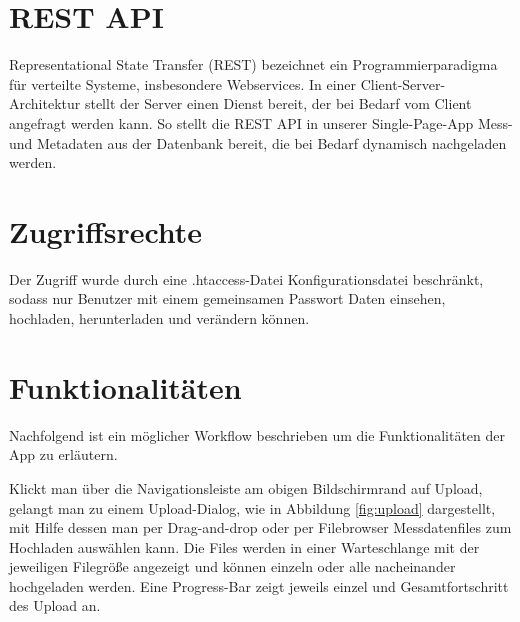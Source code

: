 





\section{REST API}

Representational State Transfer (REST) bezeichnet ein Programmierparadigma für verteilte Systeme, insbesondere Webservices. In einer Client-Server-Architektur stellt der Server einen Dienst bereit, der bei Bedarf vom Client angefragt werden kann. So stellt die REST API in unserer Single-Page-App Mess- und Metadaten aus der Datenbank bereit, die bei Bedarf dynamisch nachgeladen werden.


\section{Zugriffsrechte}

Der Zugriff wurde durch eine .htaccess-Datei Konfigurationsdatei beschränkt, sodass nur Benutzer mit einem gemeinsamen Passwort Daten einsehen, hochladen, herunterladen und verändern können.


\section{Funktionalitäten} 

Nachfolgend ist ein möglicher Workflow beschrieben um die Funktionalitäten der App zu erläutern.

Klickt man über die Navigationsleiste am obigen Bildschirmrand auf Upload, gelangt man zu einem Upload-Dialog, wie in Abbildung \ref{fig:upload} dargestellt, mit Hilfe dessen man per Drag-and-drop oder per Filebrowser Messdatenfiles zum Hochladen auswählen kann. Die Files werden in einer Warteschlange mit der jeweiligen Filegröße angezeigt und können einzeln oder alle nacheinander hochgeladen werden. Eine Progress-Bar zeigt jeweils einzel und Gesamtfortschritt des Upload an.

